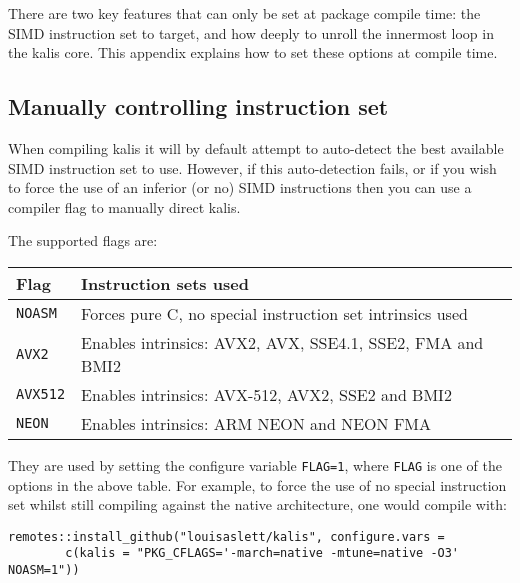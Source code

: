 \documentclass[a4paper]{article}
\newcommand{\pkg}[1]{{\fontseries{m}\fontseries{b}\selectfont #1}}
\begin{document}
There are two key features that can only be set at package compile time: the SIMD instruction set to target, and how deeply to unroll the innermost loop in the \pkg{kalis} core.
This appendix explains how to set these options at compile time.



\subsection{Manually controlling instruction set}
\label{apx:compileis}

When compiling \pkg{kalis} it will by default attempt to auto-detect the best available SIMD instruction set to use.
However, if this auto-detection fails, or if you wish to force the use of an inferior (or no) SIMD instructions then you can use a compiler flag to manually direct \pkg{kalis}.

The supported flags are:

\begin{longtable}{ll}
	\toprule
	\textbf{Flag} & \textbf{Instruction sets used} \\
	\midrule
	\texttt{NOASM} & Forces pure C, no special instruction set intrinsics used \\
	\texttt{AVX2} & Enables intrinsics: AVX2, AVX, SSE4.1, SSE2, FMA and BMI2 \\
	\texttt{AVX512} & Enables intrinsics: AVX-512, AVX2, SSE2 and BMI2 \\
	\texttt{NEON} & Enables intrinsics: ARM NEON and NEON FMA \\
	\bottomrule
\end{longtable}

They are used by setting the configure variable \texttt{FLAG=1}, where \texttt{FLAG} is one of the options in the above table.
For example, to force the use of no special instruction set whilst still compiling against the native architecture, one would compile with:

\begin{verbatim}
remotes::install_github("louisaslett/kalis", configure.vars =
        c(kalis = "PKG_CFLAGS='-march=native -mtune=native -O3' NOASM=1"))
\end{verbatim}

%
\end{document}
